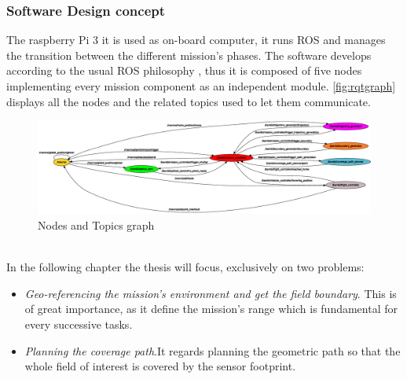  \subsubsection{Software Design concept} %
 \label{ssub:software_design}
 The raspberry Pi 3 it is used as on-board computer, it runs ROS and manages the transition between the different mission's phases. The software develops according to the usual ROS philosophy \cite{288}, thus it is composed of five nodes implementing every mission component as an independent module. \autoref{fig:rqtgraph} displays all the nodes and the related topics used to let them communicate.
\begin{figure}[ht]
    \centering
    \includegraphics[width=1.4\textwidth, angle=270]{figures/C1/rqtgraph.eps}
    \caption{Nodes and Topics graph}
    \label{fig:rqtgraph}
\end{figure}\\
 In the following chapter the thesis will focus, exclusively on two problems:
 \begin{itemize}
  	\item \textit{Geo-referencing the mission's environment and get the field boundary}. This is of great importance, as it define the mission's range which is fundamental for every successive tasks.
  	\item \textit{Planning the coverage path}.It regards planning the geometric path so that the whole field of interest is covered by the sensor footprint.
  \end{itemize}
 

 

{}

